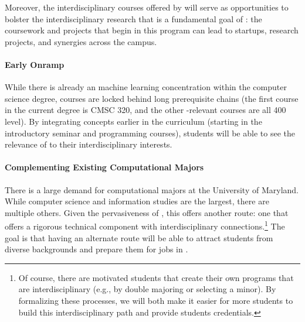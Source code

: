Moreover, the interdisciplinary courses offered by \short{} will serve as opportunities to bolster the interdisciplinary research that is a fundamental goal of \aim{}: the coursework and projects that begin in this program can lead to startups, research projects, and synergies across the campus.

\paragraph{Early Onramp}

While there is already an machine learning  concentration within the computer science degree,  courses are locked behind long prerequisite chains (the first course in the current  degree is CMSC 320, and the other -relevant courses are all 400 level).  
%
By integrating  concepts earlier in the curriculum (starting in the introductory seminar and programming courses), students will be able to see the relevance of  to their interdisciplinary interests.

\paragraph{Complementing Existing Computational Majors}

There is a large demand for computational majors at the University of Maryland.  
%
While computer science and information studies are the largest, there are multiple others.
%
Given the pervasiveness of , this offers another route: one that offers a rigorous technical component with interdisciplinary connections.\footnote{Of course, there are motivated students that create their own programs that are interdisciplinary (e.g., by double majoring or selecting a minor).  By formalizing these processes, we will both make it easier for more students to build this interdisciplinary path and provide students credentials.}
%
The goal is that having an alternate route will be able to attract students from diverse backgrounds and prepare them for jobs in . 

